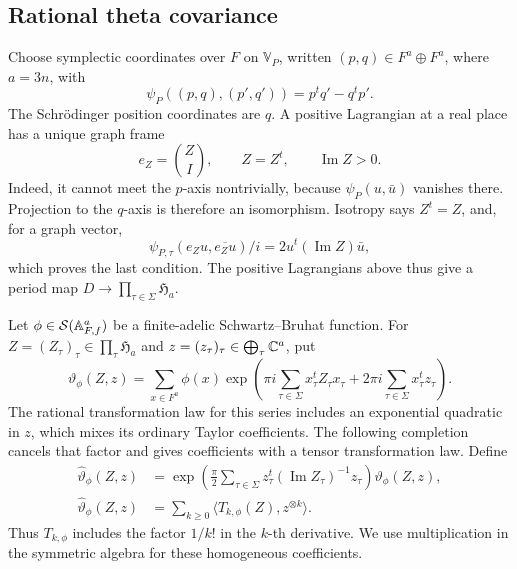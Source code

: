 \subsection{Rational theta covariance}\label{subsec:theta-covariance}

Choose symplectic coordinates over \(F\) on \(\mathbb V_P\),
written \((p,q)\in F^a\oplus F^a\), where \(a=3n\), with
\[
 \psi_P((p,q),(p',q'))=p^tq'-q^tp'.
\]
The Schr\"odinger position coordinates are \(q\).  A positive
Lagrangian at a real place has a unique graph frame
\[
 e_Z=\binom ZI,\qquad Z=Z^t,\qquad \operatorname{Im}Z>0.
\]
Indeed, it cannot meet the \(p\)-axis nontrivially, because
\(\psi_P(u,\bar u)\) vanishes there.  Projection to the
\(q\)-axis is therefore an isomorphism.  Isotropy says \(Z^t=Z\),
and, for a graph vector,
\[
 \psi_{P,\tau}(e_Zu,\overline{e_Zu})/i
       =2u^t(\operatorname{Im}Z)\bar u,
\]
which proves the last condition.  The positive Lagrangians above
thus give a period map \(D\to\prod_{\tau\in\Sigma}\mathfrak H_a\).

Let \(\phi\in\mathcal S(\mathbb{A}_{F,f}^a)\) be a finite-adelic
Schwartz--Bruhat function.  For
\(Z=(Z_\tau)_\tau\in\prod_\tau\mathfrak H_a\) and
\(z=(z_\tau)_\tau\in\bigoplus_\tau\mathbb{C}^a\), put
\begin{equation}\label{eq:theta-series}
 \vartheta_\phi(Z,z)
  =\sum_{x\in F^a}\phi(x)
    \exp\!\left(
       \pi i\sum_{\tau\in\Sigma}x_\tau^tZ_\tau x_\tau+
       2\pi i\sum_{\tau\in\Sigma}x_\tau^tz_\tau\right).
\end{equation}
The rational transformation law for this series includes an exponential
quadratic in \(z\), which mixes its ordinary Taylor coefficients.
The following completion cancels that factor and gives coefficients
with a tensor transformation law.  Define
\begin{equation}\label{eq:theta-completion}
 \begin{split}
 \widehat\vartheta_\phi(Z,z)
  &=\exp\!\left(\frac{\pi}{2}\sum_{\tau\in\Sigma}
       z_\tau^t(\operatorname{Im}Z_\tau)^{-1}z_\tau\right)
       \vartheta_\phi(Z,z),\\
 \widehat\vartheta_\phi(Z,z)
  &=\sum_{k\ge0}\langle T_{k,\phi}(Z),z^{\otimes k}\rangle .
 \end{split}
\end{equation}
Thus \(T_{k,\phi}\) includes the factor \(1/k!\) in the \(k\)-th
derivative.  We use multiplication in the symmetric algebra for
these homogeneous coefficients.


